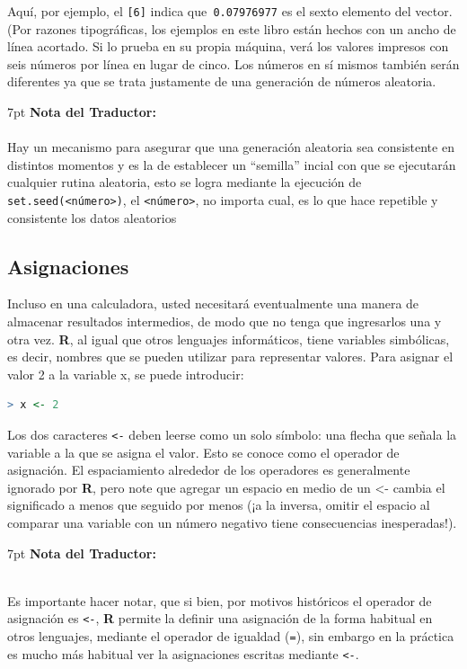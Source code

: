\documentclass[spanish]{extbook}
\newenvironment{tradnote}{%
  \def\FrameCommand{%
    \hspace{1pt}%
    {\color{darkblue}\vrule width 2pt}%
    {\color{formalshade}\vrule width 4pt}%
    \colorbox{formalshade}%
  }%
  \vspace{12pt}
  \MakeFramed{\advance\hsize-\width\FrameRestore}%
  \noindent\hspace{-4.55pt}%
  \begin{adjustwidth}{}{7pt}%
  \vspace{1pt}%
  \textbf{Nota del Traductor:\\\\}%
}
{%
  \vspace{6pt}\end{adjustwidth}\endMakeFramed%
}
\numberwithin{equation}{section}
\numberwithin{figure}{section}
\begin{document}
Aquí, por ejemplo, el \texttt{{[}6{]}} indica que\texttt{ 0.07976977}
es el sexto elemento del vector. (Por razones tipográficas, los ejemplos
en este libro están hechos con un ancho de línea acortado. Si lo prueba
en su propia máquina, verá los valores impresos con seis números por
línea en lugar de cinco. Los números en sí mismos también serán diferentes
ya que se trata justamente de una generación de números aleatoria.

\begin{tradnote} Hay un mecanismo para asegurar que una generación aleatoria
sea consistente en distintos momentos y es la de establecer un ``semilla''
incial con que se ejecutarán cualquier rutina aleatoria, esto se logra mediante
la ejecución de \texttt{set.seed(<número>)}, el \texttt{<número>}, no importa
cual, es lo que hace repetible y consistente los datos aleatorios\end{tradnote} 

\subsection{Asignaciones}

Incluso en una calculadora, usted necesitará eventualmente una manera de
almacenar resultados intermedios, de modo que no tenga que ingresarlos una y
otra vez. \textbf{R}, al igual que otros lenguajes informáticos, tiene
variables simbólicas, es decir, nombres que se pueden utilizar para representar
valores. Para asignar el valor 2 a la variable x, se puede introducir:

\begin{lstlisting}[language=R]
> x <- 2
\end{lstlisting}


Los dos caracteres \texttt{<-} deben leerse como un solo símbolo: una flecha
que señala la variable a la que se asigna el valor. Esto se conoce como el
operador de asignación. El espaciamiento alrededor de los operadores es
generalmente ignorado por \textbf{R}, pero note que agregar un espacio en medio
de un <- cambia el significado a \textquotedbl{}menos que\textquotedbl{}
seguido por \textquotedbl{}menos\textquotedbl{} (¡a la inversa, omitir el
espacio al comparar una variable con un número negativo tiene consecuencias
inesperadas!). 

\begin{tradnote}
	Es importante hacer notar, que si bien, por motivos históricos
	el operador de asignación es \texttt{<-}, \textbf{R} permite la definir una asignación
	de la forma habitual en otros lenguajes, mediante el operador de igualdad (\texttt{=}),
	sin embargo en la práctica es mucho más habitual ver la asignaciones
	escritas mediante \texttt{<-}.
\end{tradnote} 
\end{document}
